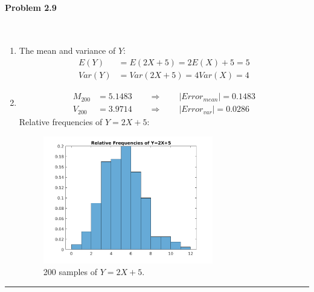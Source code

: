 \documentclass[12pt, letterpaper]{scrartcl}
\begin{document}
\paragraph*{Problem 2.9} \hfill\\
\begin{enumerate}[((a))]
    \item The mean and variance of $Y$:
    \begin{align*}
        E(Y)&=E(2X+5)=2E(X)+5=5\\
        Var(Y)&=Var(2X+5)=4Var(X)=4
    \end{align*}
    \item
    \begin{align*}
        M_{200}&=5.1483 \qquad\Rightarrow\qquad |Error_{mean}|=0.1483\\
        V_{200}&=3.9714 \qquad\Rightarrow\qquad |Error_{var}|=0.0286
    \end{align*}
    Relative frequencies of $Y=2X+5$:
    \begin{figure}[h!]
        \centering
        \includegraphics[width=0.7\textwidth]{hw2_figures/2.9.png}
        \caption{200 samples of $Y=2X+5$.}
    \end{figure}
\end{enumerate}
\hrule
\end{document}
